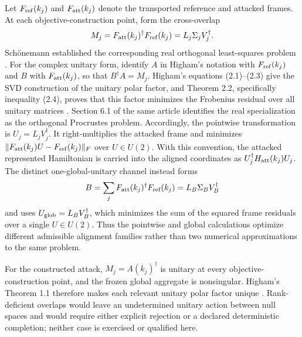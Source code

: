 \documentclass[11pt]{article}
\begin{document}
Let $F_{\rm ref}(k_j)$ and $F_{\rm att}(k_j)$ denote the transported reference and attacked frames. At each objective-construction point, form the cross-overlap
\begin{equation}\label{eq:m2-pointwise-procrustes}
M_j=F_{\rm att}(k_j)^\dagger F_{\rm ref}(k_j)=L_j\Sigma_jV_j^\dagger .
\end{equation}
Sch\"onemann established the corresponding real orthogonal least-squares problem \cite{schonemann1966}. For the complex unitary form, identify $A$ in Higham's notation with $F_{\rm ref}(k_j)$ and $B$ with $F_{\rm att}(k_j)$, so that $B^\dagger A=M_j$. Higham's equations (2.1)--(2.3) give the SVD construction of the unitary polar factor, and Theorem 2.2, specifically inequality (2.4), proves that this factor minimizes the Frobenius residual over all unitary matrices \cite{higham1986}. Section 6.1 of the same article identifies the real specialization as the orthogonal Procrustes problem. Accordingly, the pointwise transformation is $U_j=L_jV_j^\dagger$. It right-multiplies the attacked frame and minimizes $\|F_{\rm att}(k_j)U-F_{\rm ref}(k_j)\|_F$ over $U\in U(2)$. With this convention, the attacked represented Hamiltonian is carried into the aligned coordinates as $U_j^\dagger H_{\rm att}(k_j)U_j$. The distinct one-global-unitary channel instead forms
\begin{equation}\label{eq:m2-global-procrustes}
B=\sum_jF_{\rm att}(k_j)^\dagger F_{\rm ref}(k_j)=L_B\Sigma_BV_B^\dagger
\end{equation}
and uses $U_{\rm glob}=L_BV_B^\dagger$, which minimizes the sum of the squared frame residuals over a single $U\in U(2)$. Thus the pointwise and global calculations optimize different admissible alignment families rather than two numerical approximations to the same problem.

For the constructed attack, $M_j=A(k_j)^\dagger$ is unitary at every objective-construction point, and the frozen global aggregate is nonsingular. Higham's Theorem 1.1 therefore makes each relevant unitary polar factor unique \cite{higham1986}. Rank-deficient overlaps would leave an undetermined unitary action between null spaces and would require either explicit rejection or a declared deterministic completion; neither case is exercised or qualified here.
\end{document}
